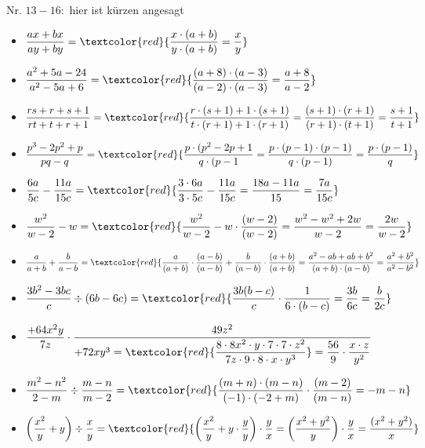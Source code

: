 \documentclass[11pt, a4paper, twoside, fleqn]{article}
\begin{document}
Nr. $ 13 -16:$ hier ist kürzen angesagt
\begin{itemize}[itemsep=3ex , leftmargin=*]
\item $ \dfrac{ax + bx}{ay + by} = \textcolor{red}{\dfrac{x \cdot (a+b)}{y \cdot (a+b)} = \dfrac{x}{y}} $
\item $ \dfrac{a^{2} + 5a -24}{a^{2} - 5a + 6} = \textcolor{red}{\dfrac{(a + 8) \cdot (a - 3)}{(a - 2) \cdot (a-3)} = \dfrac{a + 8}{a - 2}} $
\item $ \dfrac{rs + r + s + 1}{rt + t +r + 1} = \textcolor{red}{\dfrac{r \cdot (s + 1) + 1 \cdot(s + 1)}{t \cdot(r + 1) +1 \cdot (r + 1)} = \dfrac{(s + 1) \cdot (r + 1)}{(r + 1) \cdot (t + 1)} = \dfrac{s + 1}{t + 1}} $
\item $ \dfrac{p^{3} - 2p^{2} + p}{pq - q} = \textcolor{red}{\dfrac{p \cdot (p^{2} - 2p + 1}{q \cdot (p - 1} = \dfrac{p \cdot (p - 1) \cdot (p - 1)}{q \cdot (p-1)} = \dfrac{p \cdot (p - 1)}{q}} $ 
\item $ \dfrac{6a}{5c} - \dfrac{11a}{15c} = \textcolor{red}{\dfrac{3 \cdot 6a}{3 \cdot 5c} - \dfrac{11a}{15c} = \dfrac{18a - 11a}{15}= \dfrac{7a}{15c}} $
\item $ \dfrac{w^{2}}{w - 2} - w = \textcolor{red}{\dfrac{w^{2}}{w - 2} - w \cdot \dfrac{(w - 2)}{(w - 2)} = \dfrac{w^{2} - w^{2} + 2w}{w - 2} = \dfrac{2w}{w - 2}} $
\item $ \dfrac{a}{a + b} + \dfrac{b}{a - b} = \textcolor{red}{\dfrac{a}{(a + b)} \cdot \dfrac{(a - b)}{(a - b)} + \dfrac{b}{(a - b)} \cdot \dfrac{
(a + b)}{(a + b)} = \dfrac{ a^{2} - ab + ab + b^{2}}{(a + b) \cdot (a - b)} = \dfrac{a^{2} + b^{2}}{a^{2} - b^{2}}} $
\item $ \dfrac{3b^{2} - 3bc}{c} \div (6b - 6c) = \textcolor{red}{\dfrac{3b(b - c)}{c} \cdot \dfrac{1}{6 \cdot (b - c)} = \dfrac{3b}{6c} = \dfrac{b}{2c}} $
\item $ \dfrac{+64x^{2}y}{7z} \cdot \dfrac{49z^{2}}{+72xy^{3} = \textcolor{red}{\dfrac{8 \cdot 8x^{2} \cdot y \cdot 7 \cdot 7 \cdot z^{2}}{7z \cdot 9 \cdot 8 \cdot x \cdot y^{3}}} = \dfrac{56}{9} \cdot \dfrac{ x \cdot z}{y^{2}}} $
\item $ \dfrac{m^{2} - n^{2}}{2 - m} \div \dfrac{m - n}{m - 2} = \textcolor{red}{\dfrac{(m + n) \cdot (m - n)}{(-1) \cdot (-2 + m)} \cdot \dfrac{(m - 2)}{(m - n)} = -m -n} $
\item $ \left(\dfrac{x^{2}}{y} + y \right) \div \dfrac{x}{y} = \textcolor{red}{\left(\dfrac{x^{2}}{y} + y \cdot \dfrac{y}{y}\right) \cdot \dfrac{y}{x} = \left(\dfrac{x^{2} + y^{2}}{y} \right) \cdot \dfrac{y}{x} = \dfrac{(x^{2} + y^{2})}{x}} $ 

\end{itemize}
\end{document}
